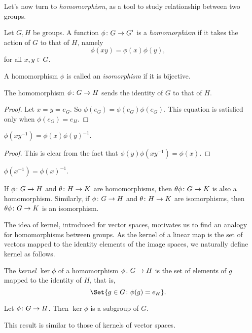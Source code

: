 \documentclass[main.tex]{subfiles}
\begin{document}
			Let's now turn to \textit{homomorphism}, as a tool to study relationship between two groups.
		\begin{definition}
			Let $G, H$ be groups. A function $\phi \colon G \rightarrow G'$ is a \textit{homomorphism} if it takes the action of $G$ to that of $H$, namely
			\begin{equation*}
					\phi(xy) = \phi(x)\phi(y),
			\end{equation*}
			for all $x, y \in G$.
		\end{definition}
		\begin{definition}
			A homomorphism $\phi$ is called an \textit{isomorphism} if it is bijective.
		\end{definition}
		\begin{lemma}
			The homomorphism $\phi\colon G \rightarrow H$ sends the identity of $G$ to that of $H$.
		\end{lemma}
		\begin{proof}
			Let $x = y = e_G$. So $\phi(e_G) = \phi(e_G)\phi(e_G)$. This equation is satisfied only when $\phi(e_G) = e_{H}$.
		\end{proof}
		\begin{lemma}
			$\phi(xy^{-1}) = \phi(x)\phi(y)^{-1}$.
		\end{lemma}
		\begin{proof}
			This is clear from the fact that $\phi(y)\phi(xy^{-1}) = \phi(x)$.
		\end{proof}
		\begin{lemma}
			$\phi(x^{-1}) = \phi(x)^{-1}$.
		\end{lemma}
		\begin{lemma}
			If $\phi\colon G \rightarrow H$ and $\theta\colon H \rightarrow K$ are homomorphisms, then $\theta\phi\colon G \rightarrow K$ is also a homomorphism. Similarly, if $\phi\colon G \rightarrow H$ and $\theta\colon H \rightarrow K$ are isomorphisms, then $\theta\phi\colon G \rightarrow K$ is an isomorphism.
		\end{lemma}
		The idea of kernel, introduced for vector spaces, motivates us to find an analogy for homomorphisms between groups. As the kernel of a linear map is the set of vectors mapped to the identity elements of the image spaces, we naturally define kernel as follows.
		\begin{definition}
			The \textit{kernel} $\ker\phi$ of a homomorphism $\phi\colon G \rightarrow H$ is the set of elements of $g$ mapped to the identity of $H$, that is,
			\begin{equation*}
				\Set{g \in G \colon \phi(g) = e_H}.
			\end{equation*}
		\end{definition}
		\begin{theorem}
			Let $\phi\colon G \rightarrow H$. Then $\ker\phi$ is a subgroup of $G$.
		\end{theorem}
		This result is similar to those of kernels of vector spaces.
\end{document}

